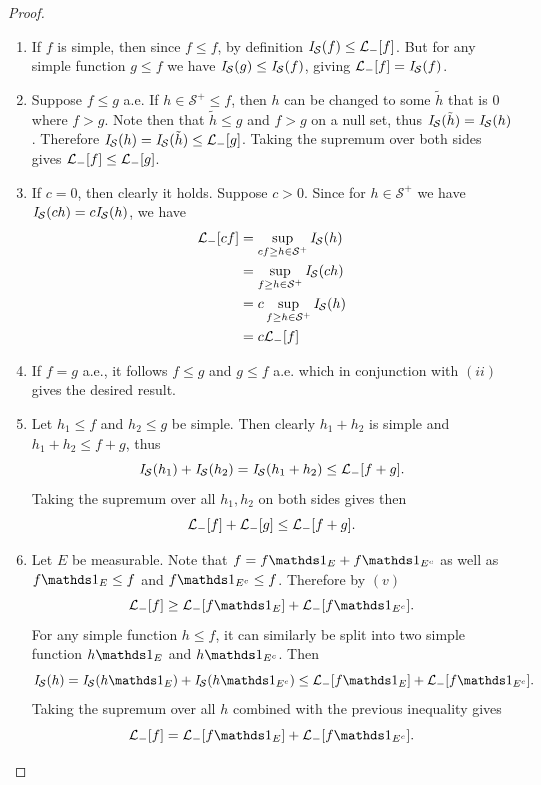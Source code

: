 \documentclass[hw_all.tex]{subfiles}
\begin{document}
\begin{proof}
    \begin{enumerate}
        \item 
            If $f$ is simple, then since $f \leq f$, by definition $\mathit{I}_{\mathcal{S}}(f) \leq \mathcal{L}_{-}[f]$. But for any simple function $g \leq f$ we have $\mathit{I}_{\mathcal{S}}(g) \leq \mathit{I}_{\mathcal{S}}(f)$, giving $\mathcal{L}_{-}[f] = \mathit{I}_{\mathcal{S}}(f)$.
            
        \item
            Suppose $f \leq g$ a.e. If $h \in \mathcal{S}^+ \leq f$, then $h$ can be changed to some $\tilde{h}$ that is $0$ where $f > g$. Note then that $\tilde{h} \leq g$ and $f > g$ on a null set, thus $\mathit{I}_{\mathcal{S}}(\tilde{h}) = \mathit{I}_{\mathcal{S}}(h)$. Therefore $\mathit{I}_{\mathcal{S}}(h) = \mathit{I}_{\mathcal{S}}(\tilde{h}) \leq \mathcal{L}_{-}[g]$. Taking the supremum over both sides gives $\mathcal{L}_{-}[f] \leq \mathcal{L}_{-}[g]$.

        \item
            If $c = 0$, then clearly it holds. Suppose $c > 0$. Since for $h \in \mathcal{S}^+$ we have $\mathit{I}_{\mathcal{S}}(ch) = c \mathit{I}_{\mathcal{S}}(h)$, we have
            \begin{align*}
                \mathcal{L}_{-}[cf] &= \sup_{cf \geq h \in \mathcal{S}^+} \mathit{I}_{\mathcal{S}}(h) \\
                          &= \sup_{f \geq h \in \mathcal{S}^+} \mathit{I}_{\mathcal{S}}(ch) \\
                          &= c \sup_{f \geq h \in \mathcal{S}^+} \mathit{I}_{\mathcal{S}}(h) \\
                          &= c \mathcal{L}_{-}[f]
            \end{align*}

        \item
            If $f = g$ a.e., it follows $f \leq g$ and $g \leq f$ a.e. which in conjunction with $(ii)$ gives the desired result.

        \item 
            Let $h_1 \leq f$ and $h_2 \leq g$ be simple. Then clearly $h_1 + h_2$ is simple and $h_1 + h_2 \leq f + g$, thus
            \[
                \mathit{I}_{\mathcal{S}}(h_1) + \mathit{I}_{\mathcal{S}}(h_2) = \mathit{I}_{\mathcal{S}}(h_1 + h_2) \leq \mathcal{L}_{-}[f + g]
            .\]
            Taking the supremum over all $h_1, h_2$ on both sides gives then
            \[
                \mathcal{L}_{-}[f] + \mathcal{L}_{-}[g] \leq \mathcal{L}_{-}[f + g]
            .\]

        \item 
            Let $E$ be measurable. Note that $f = f \ind{E} + f \ind{E^c}$ as well as $f \ind{E} \leq f$ and $f \ind{E^c} \leq f$. Therefore by $(v)$
            \[
                \lint[f] \geq \lint[f \ind{E}] + \lint[f \ind{E^c}]
            .\]
            For any simple function $h \leq f$, it can similarly be split into two simple function $h \ind{E}$ and $h \ind{E^c}$. Then
            \[
                \sint(h) = \sint(h \ind{E}) + \sint(h \ind{E^c}) \leq \lint[f \ind{E}] + \lint[f \ind{E^c}]
            .\]
            Taking the supremum over all $h$ combined with the previous inequality gives
            \[
                \lint[f] = \lint[f \ind{E}] + \lint[f \ind{E^c}]
            .\]


\end{enumerate}
\end{proof}
\end{document}
